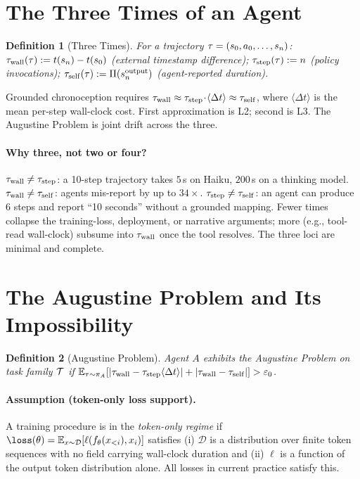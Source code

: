 \documentclass[letterpaper]{article}
\newtheorem{definition}{Definition}
\begin{document}
\section{The Three Times of an Agent}
\label{sec:three-times}

\begin{definition}[Three Times]
\label{def:three-times}
For a trajectory $\tau = (s_0, a_0, \ldots, s_n)$:
$\tau_{\mathrm{wall}}(\tau) := t(s_n) - t(s_0)$ (external timestamp difference);
$\tau_{\mathrm{step}}(\tau) := n$ (policy invocations);
$\tau_{\mathrm{self}}(\tau) := \Pi(s_n^{\text{output}})$ (agent-reported duration).
\end{definition}

Grounded chronoception requires
$\tau_{\mathrm{wall}} \approx \tau_{\mathrm{step}}\!\cdot\!\langle\Delta t\rangle \approx \tau_{\mathrm{self}}$,
where $\langle\Delta t\rangle$ is the mean per-step wall-clock cost. First approximation is L2; second is L3. The Augustine Problem is joint drift across the three.

\paragraph{Why three, not two or four?} $\tau_{\mathrm{wall}} \neq \tau_{\mathrm{step}}$: a 10-step trajectory takes $5$\,s on Haiku, $200$\,s on a thinking model. $\tau_{\mathrm{wall}} \neq \tau_{\mathrm{self}}$: agents mis-report by up to $34\times$. $\tau_{\mathrm{step}} \neq \tau_{\mathrm{self}}$: an agent can produce 6 steps and report ``10 seconds'' without a grounded mapping. Fewer times collapse the training-loss, deployment, or narrative arguments; more (e.g., tool-read wall-clock) subsume into $\tau_{\mathrm{wall}}$ once the tool resolves. The three loci are minimal and complete.

\section{The Augustine Problem and Its Impossibility}
\label{sec:cit}

\begin{definition}[Augustine Problem]
Agent $A$ exhibits the Augustine Problem on task family $\mathcal{T}$ if
$\mathbb{E}_{\tau \sim \pi_A}[|\tau_{\mathrm{wall}} - \tau_{\mathrm{step}}\langle\Delta t\rangle| + |\tau_{\mathrm{wall}} - \tau_{\mathrm{self}}|] > \varepsilon_0$.
\end{definition}

\paragraph{Assumption (token-only loss support).}
\label{ass:token}
A training procedure is in the \emph{token-only regime} if
$\loss(\theta) = \mathbb{E}_{x \sim \mathcal{D}}[\ell(f_\theta(x_{<i}), x_i)]$
satisfies (i) $\mathcal{D}$ is a distribution over finite token sequences with no field carrying wall-clock duration and (ii) $\ell$ is a function of the output token distribution alone. All losses in current practice satisfy this.
\end{document}
